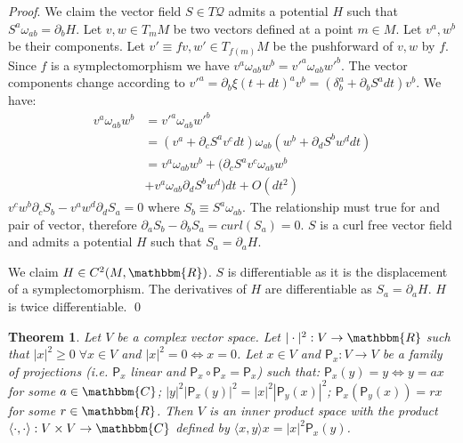 \documentclass[aps,pra,10pt,twocolumn,floatfix,nofootinbib]{revtex4-1}
\numberwithin{equation}{section}
\newtheorem{thrm}[equation]{Theorem}
\theoremstyle{definition}
\renewenvironment{proof}{\emph{Proof}.}{\qed}
\begin{document}
\begin{proof}
	We claim the vector field $S \in T\mathcal{Q}$ admits a potential $H$ such that $S^{a} \omega_{ab} = \partial_{b}H$. Let $v, w \in T_m M$ be two vectors defined at a point $m \in M$. Let $v^a, w^b$ be their components. Let $v'\equiv f v, w' \in T_{f(m)}M$ be the pushforward of $v, w$ by $f$. Since $f$ is a symplectomorphism we have $v^{a} \omega_{ab} w^{b} = v'^{a} \omega_{ab} w'^{b}$. The vector components change according to $v'^a = \partial_b \xi(t+dt)^a v^b = (\delta^a_b + \partial_b S^a dt) v^b$. We have:
	\begin{align*}
	v^{a} \omega_{ab} w^{b} &= v'^{a} \omega_{ab} w'^{b}  \\
	&= (v^{a} + \partial_{c} S^{a} v^{c} dt) \omega_{ab} ( w^{b} + \partial_{d} S^{b} w^{d} dt) \\
	&= v^{a} \omega_{ab} w^{b} + (\partial_{c} S^{a} v^{c} \omega_{ab} w^{b} \\
	&+ v^{a} \omega_{ab} \partial_{d} S^{b} w^{d}) dt + O(dt^2)
	\end{align*}
	$v^{c} w^{b} \partial_{c} S_{b} - v^{a} w^{d} \partial_{d} S_{a} = 0$ where $S_{b} \equiv S^{a} \omega_{ab}$. The relationship must true for and pair of vector, therefore $\partial_{a} S_{b} - \partial_{b} S_{a} = curl(S_{a}) = 0$. $S$ is a curl free vector field and admits a potential $H$ such that $S_{a} = \partial_{a}H$.
	
	We claim $H \in C^2(M, \mathbbm{R})$. $S$ is differentiable as it is the displacement of a symplectomorphism. The derivatives of $H$ are differentiable as $S_{a} = \partial_{a}H$. $H$ is twice differentiable.
\end{proof}

\begin{thrm}\label{thrm:inner_product}
	Let $V$ be a complex vector space. Let $| \cdot | ^2 : V \rightarrow \mathbbm{R}$ such that $|x|^2 \ge 0 \; \forall x \in V$ and $|x|^2 = 0 \Leftrightarrow x = 0$. Let $x \in V$ and $\mathsf{P}_x : V \rightarrow V$ be a family of projections (i.e. $\mathsf{P}_x$ linear and $\mathsf{P}_x \circ \mathsf{P}_x = \mathsf{P}_x$) such that: $\mathsf{P}_x (y) = y \Leftrightarrow y = a x$ for some $a \in \mathbbm{C}$; $|y|^2|\mathsf{P}_x (y)|^2=|x|^2|\mathsf{P}_y (x)|^2$; $\mathsf{P}_x (\mathsf{P}_y (x)) = r x$ for some $r \in \mathbbm{R}$.
	Then $V$ is an inner product space with the product $\langle \cdot , \cdot \rangle : V \times V \rightarrow \mathbbm{C}$ defined by $\langle x , y \rangle x = |x|^2 \mathsf{P}_x (y)$.
\end{thrm}
\end{document}
